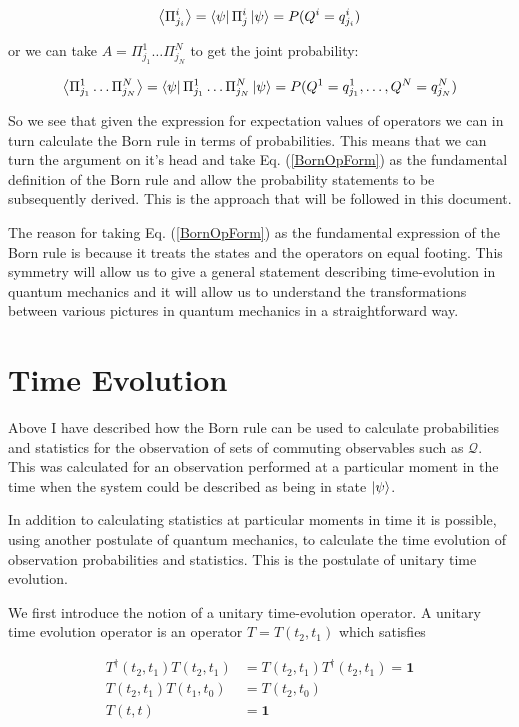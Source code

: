 \documentclass[12pt]{article}
\newcommand{\bv}[1]{\boldsymbol{#1}}
\begin{document}
\begin{align}
\Braket{\Pi^i_{j_i}} = \bra{\psi} \Pi^i_j \ket{\psi} = P(Q^i=q^i_{j_i})
\end{align}

or we can take $A = \Pi^1_{j_1}\ldots \Pi^N_{j_N}$ to get the joint probability:

\begin{align}
\Braket{\Pi^1_{j_1}\ldots \Pi^N_{j_N}} = \bra{\psi}\Pi^1_{j_1}\ldots\Pi^N_{j_N}\ket{\psi} = P(Q^1=q^1_{j_1},\ldots,Q^N=q^N_{j_N})
\end{align}

So we see that given the expression for expectation values of operators we can in turn calculate the Born rule in terms of probabilities.
This means that we can turn the argument on it's head and take Eq. (\ref{BornOpForm}) as the fundamental definition of the Born rule and allow the probability statements to be subsequently derived.
This is the approach that will be followed in this document.

The reason for taking Eq. (\ref{BornOpForm}) as the fundamental expression of the Born rule is because it treats the states and the operators on equal footing.
This symmetry will allow us to give a general statement describing time-evolution in quantum mechanics and it will allow us to understand the transformations between various pictures in quantum mechanics in a straightforward way.


\section{Time Evolution}

Above I have described how the Born rule can be used to calculate probabilities and statistics for the observation of sets of commuting observables such as $\mathcal{Q}$.
This was calculated for an observation performed at a particular moment in the time when the system could be described as being in state $\ket{\psi}$.

In addition to calculating statistics at particular moments in time it is possible, using another postulate of quantum mechanics, to calculate the time evolution of observation probabilities and statistics.
This is the postulate of unitary time evolution.

We first introduce the notion of a unitary time-evolution operator.
A unitary time evolution operator is an operator $T = T(t_2, t_1)$ which satisfies

\begin{align}
T^{\dag}(t_2,t_1)T(t_2,t_1) &= T(t_2, t_1)T^{\dag}(t_2, t_1) = \bv{1}\\
T(t_2,t_1)T(t_1,t_0) &= T(t_2,t_0)\\
T(t,t) & = \bv{1}
\end{align}
\end{document}
